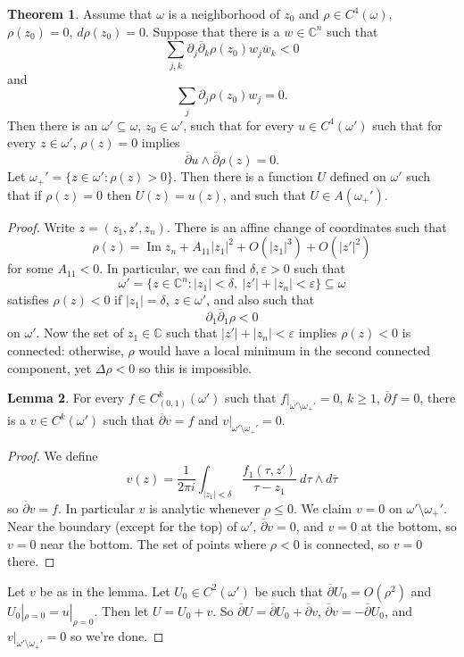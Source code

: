 \documentclass[12pt]{report}
\newcommand{\CC}{\mathbb{C}}
\newcommand{\dbar}{\overline \partial}
\renewcommand{\Im}{\operatorname{Im}}
\theoremstyle{definition}
\newtheorem{theorem}{Theorem}[chapter]
\newtheorem{lemma}[theorem]{Lemma}
\begin{document}
\begin{theorem}
    Assume that $\omega$ is a neighborhood of $z_0$ and $\rho \in C^4(\omega)$, $\rho(z_0) = 0$, $d\rho(z_0) = 0$. Suppose that there is a $w \in \CC^n$ such that
    $$\sum_{j,k} \partial_j \dbar_k \rho(z_0) w_j \overline w_k < 0$$
    and
    $$\sum_j \partial_j \rho(z_0) w_j = 0.$$
    Then there is an $\omega' \subseteq \omega$, $z_0 \in \omega'$, such that for every $u \in C^4(\omega')$ such that for every $z \in \omega'$, $\rho(z) = 0$ implies
    $$\dbar u \wedge \dbar \rho(z) = 0.$$
    Let $\omega_+' = \{z \in \omega': \rho(z) > 0\}$. Then there is a function $U$ defined on $\omega'$ such that if $\rho(z) = 0$ then $U(z) = u(z)$, and such that $U \in A(\omega_+')$.
\end{theorem}
\begin{proof}
    Write $z = (z_1, z', z_n)$. There is an affine change of coordinates such that
    $$\rho(z) = \Im z_n + A_{11}|z_1|^2 + O(|z_1|^3) + O(|z'|^2)$$
    for some $A_{11} < 0$. In particular, we can find $\delta, \varepsilon > 0$ such that
    $$\omega' = \{z \in \CC^n: |z_1| < \delta, ~|z'| + |z_n| < \varepsilon\} \subseteq \omega$$
    satisfies $\rho(z) < 0$ if $|z_1| = \delta$, $z \in \omega'$, and also such that
    $$\partial_1 \dbar_1 \rho < 0$$
    on $\omega'$. Now the set of $z_1 \in \CC$ such that $|z'| + |z_n| < \varepsilon$ implies $\rho(z) < 0$ is connected: otherwise, $\rho$ would have a local minimum in the second connected component, yet $\Delta \rho < 0$ so this is impossible.
\begin{lemma}
    For every $f \in C^k_{(0, 1)}(\omega')$ such that $f|_{\omega' \setminus \omega_+'} = 0$, $k \geq 1$, $\dbar f = 0$, there is a $v \in C^k(\omega')$ such that $\dbar v = f$ and $v|_{\omega' \setminus \omega_+'} = 0$.
\end{lemma}
\begin{proof}
    We define
    $$v(z) = \frac{1}{2\pi i} \int_{|z_1| < \delta} \frac{f_1(\tau, z')}{\tau - z_1} ~d\tau \wedge d\overline \tau$$
    so $\dbar v = f$. In particular $v$ is analytic whenever $\rho \leq 0$. We claim $v = 0$ on $\omega' \setminus \omega_+'$. Near the boundary (except for the top) of $\omega'$, $\dbar v = 0$, and $v = 0$ at the bottom, so $v = 0$ near the bottom. The set of points where $\rho < 0$ is connected, so $v = 0$ there.
\end{proof}
    Let $v$ be as in the lemma. Let $U_0 \in C^2(\omega')$ be such that $\dbar U_0 = O(\rho^2)$ and $U_0|_{\rho=0} = u|_{\rho = 0}$. Then let $U = U_0 + v$. So $\dbar U = \dbar U_0 + \dbar v$, $\dbar v = - \dbar U_0$, and $v|_{\omega' \setminus \omega_+'} = 0$ so we're done.
\end{proof}
\end{document}
